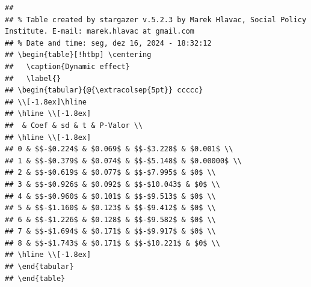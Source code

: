 \documentclass[
]{article}
\begin{document}
\begin{verbatim}
## 
## % Table created by stargazer v.5.2.3 by Marek Hlavac, Social Policy Institute. E-mail: marek.hlavac at gmail.com
## % Date and time: seg, dez 16, 2024 - 18:32:12
## \begin{table}[!htbp] \centering 
##   \caption{Dynamic effect} 
##   \label{} 
## \begin{tabular}{@{\extracolsep{5pt}} ccccc} 
## \\[-1.8ex]\hline 
## \hline \\[-1.8ex] 
##  & Coef & sd & t & P-Valor \\ 
## \hline \\[-1.8ex] 
## 0 & $$-$0.224$ & $0.069$ & $$-$3.228$ & $0.001$ \\ 
## 1 & $$-$0.379$ & $0.074$ & $$-$5.148$ & $0.00000$ \\ 
## 2 & $$-$0.619$ & $0.077$ & $$-$7.995$ & $0$ \\ 
## 3 & $$-$0.926$ & $0.092$ & $$-$10.043$ & $0$ \\ 
## 4 & $$-$0.960$ & $0.101$ & $$-$9.513$ & $0$ \\ 
## 5 & $$-$1.160$ & $0.123$ & $$-$9.412$ & $0$ \\ 
## 6 & $$-$1.226$ & $0.128$ & $$-$9.582$ & $0$ \\ 
## 7 & $$-$1.694$ & $0.171$ & $$-$9.917$ & $0$ \\ 
## 8 & $$-$1.743$ & $0.171$ & $$-$10.221$ & $0$ \\ 
## \hline \\[-1.8ex] 
## \end{tabular} 
## \end{table}
\end{verbatim}
\end{document}
